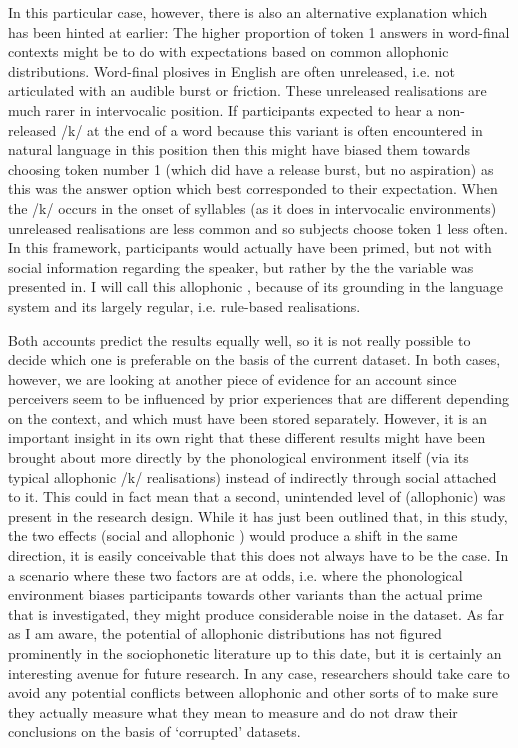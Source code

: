 In this particular case, however, there is also an alternative explanation which has been hinted at earlier: The higher proportion of token 1 answers in word-final contexts might be to do with expectations based on common allophonic distributions.
Word-final plosives in English are often unreleased, i.e. not articulated with an audible burst or friction.
These unreleased realisations are much rarer in intervocalic position.
If participants expected to hear a non-released /k/ at the end of a word because this variant is often encountered in natural language in this position then this might have biased them towards choosing token number 1 (which did have a release burst, but no aspiration) as this was the answer option which best corresponded to their expectation.
When the /k/ occurs in the onset of syllables (as it does in intervocalic environments) unreleased realisations are less common and so subjects choose token 1 less often.
In this framework, participants would actually have been primed, but not with social information regarding the speaker, but rather by the  the variable was presented in.
I will call this allophonic , because of its grounding in the language system and its largely regular, i.e. rule-based realisations.

Both accounts predict the results equally well, so it is not really possible to decide which one is preferable on the basis of the current dataset.
In both cases, however, we are looking at another piece of evidence for an  account since perceivers seem to be influenced by prior experiences that are different depending on the context, and which must have been stored separately.
However, it is an important insight in its own right that these different results might have been brought about more directly by the phonological environment itself (via its typical allophonic /k/ realisations) instead of indirectly through social  attached to it.
This could in fact mean that a second, unintended level of (allophonic)  was present in the research design.
While it has just been outlined that, in this study, the two effects (social  and allophonic ) would produce a shift in the same direction, it is easily conceivable that this does not always have to be the case.
In a scenario where these two factors are at odds, i.e. where the phonological environment biases participants towards other variants than the actual prime that is investigated, they might produce considerable noise in the dataset.
As far as I am aware, the  potential of allophonic distributions has not figured prominently in the sociophonetic literature up to this date, but it is certainly an interesting avenue for future research.
In any case, researchers should take care to avoid any potential conflicts between allophonic and other sorts of  to make sure they actually measure what they mean to measure and do not draw their conclusions on the basis of `corrupted' datasets.


